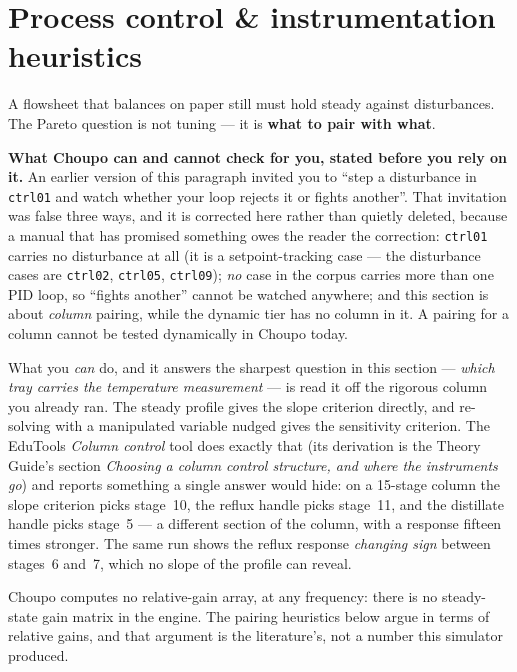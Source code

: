 \documentclass[11pt,a4paper]{article}
\begin{document}
\hypertarget{process-control--instrumentation-heuristics}{%
\section{Process control \& instrumentation
heuristics}\label{process-control--instrumentation-heuristics}}

A flowsheet that balances on paper still must hold steady against
disturbances. The Pareto question is not tuning --- it is \textbf{what
to pair with what}.

\textbf{What Choupo can and cannot check for you, stated before you rely on
it.} An earlier version of this paragraph invited you to ``step a disturbance
in \texttt{ctrl01} and watch whether your loop rejects it or fights another''.
That invitation was false three ways, and it is corrected here rather than
quietly deleted, because a manual that has promised something owes the reader
the correction: \texttt{ctrl01} carries no disturbance at all (it is a
setpoint-tracking case --- the disturbance cases are \texttt{ctrl02},
\texttt{ctrl05}, \texttt{ctrl09}); \emph{no} case in the corpus carries more
than one PID loop, so ``fights another'' cannot be watched anywhere; and this
section is about \emph{column} pairing, while the dynamic tier has no column
in it. A pairing for a column cannot be tested dynamically in Choupo today.

What you \emph{can} do, and it answers the sharpest question in this section
--- \emph{which tray carries the temperature measurement} --- is read it off
the rigorous column you already ran. The steady profile gives the slope
criterion directly, and re-solving with a manipulated variable nudged gives
the sensitivity criterion. The EduTools \emph{Column control} tool does
exactly that (its derivation is the Theory Guide's section \emph{Choosing a
column control structure, and where the instruments go}) and reports
something a single
answer would hide: on a 15-stage column the slope criterion picks stage~10,
the reflux handle picks stage~11, and the distillate handle picks stage~5 ---
a different section of the column, with a response fifteen times stronger. The
same run shows the reflux response \emph{changing sign} between stages~6
and~7, which no slope of the profile can reveal.

Choupo computes no relative-gain array, at any frequency: there is no
steady-state gain matrix in the engine. The pairing heuristics below argue in
terms of relative gains, and that argument is the literature's, not a number
this simulator produced.
\end{document}
